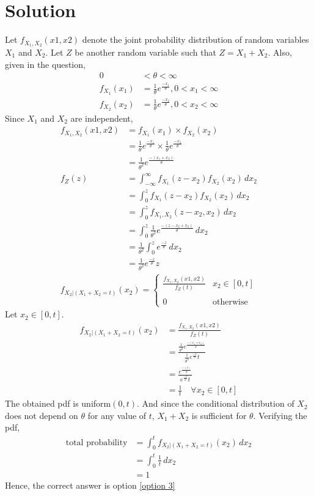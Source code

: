 \documentclass[journal,12pt,twocolumn]{IEEEtran}
\begin{document}
\section*{Solution}
Let $f_{X_1,X_2}(x1,x2)$ denote the joint probability distribution of random variables $X_1$ and $X_2$. Let $Z$ be another random variable such that $Z=X_1+X_2$. Also, given in the question,
\begin{align}
    0 &< \theta < \infty
    \\f_{X_1}(x_1) &= \frac{1}{\theta}e^{\frac{-x_1}{\theta}}, 0<x_1<\infty
    \\f_{X_2}(x_2) &= \frac{1}{\theta}e^{\frac{-x_2}{\theta}}, 0<x_2<\infty
\end{align}
Since $X_1$ and $X_2$ are independent, 
\begin{align}
f_{X_1,X_2}(x1,x2) &= f_{X_1}(x_1) \times f_{X_2}(x_2)
    \\&= \frac{1}{\theta}e^{\frac{-x_1}{\theta}} \times \frac{1}{\theta}e^{\frac{-x_2}{\theta}}
    \\&= \frac{1}{\theta^2}e^{\frac{-(x_1+x_2)}{\theta}}
    \\f_Z(z) &=  \int_{-\infty}^{\infty} f_{X_1}(z-x_2)f_{X_2}(x_2) \,dx_2 
    \\&= \int_{0}^{z} f_{X_1}(z-x_2)f_{X_2}(x_2) \,dx_2
    \\&= \int_{0}^{z} f_{X_1,X_2}(z-x_2, x_2) \,dx_2
    \\&= \int_{0}^{z} \frac{1}{\theta^2}e^{\frac{-(z-x_2+x_2)}{\theta}} \,dx_2
    \\&= \frac{1}{\theta^2}\int_{0}^{z} e^{\frac{-z}{\theta}} \,dx_2
    \\&= \frac{1}{\theta^2}e^{\frac{-z}{\theta}}z
\end{align}
\begin{align}
    f_{X_2|(X_1+X_2=t)}(x_2) = 
    \begin{cases}
    \frac{f_{X_1,X_2}(x1,x2)}{f_Z(t)} &  x_2 \in [0, t]\\ ~\\[-1em]
    0 & \text{otherwise}
    \end{cases}
\end{align}
Let $ x_2 \in [0, t]$.
\begin{align}
    f_{X_2|(X_1+X_2=t)}(x_2) &= \frac{f_{X_1,X_2}(x1,x2)}{f_Z(t)}
    \\&= \frac{\frac{1}{\theta^2}e^{\frac{-(x_1+x_2)}{\theta}}}{\frac{1}{\theta^2}e^{\frac{-t}{\theta}}t}
    \\&= \frac{e^{\frac{-(t)}{\theta}}}{e^{\frac{-t}{\theta}}t}
    \\&= \frac{1}{t} \quad \forall x_2 \in [0, t]
\end{align}
The obtained pdf is uniform$(0,t)$. And since the conditional distribution of $X_2$ does not depend on $\theta$ for any value of $t$, $X_1+X_2$ is sufficient for $\theta$. Verifying the pdf,
\begin{align}
    \text{total probability} &= \int_{0}^{t} f_{X_2|(X_1+X_2=t)}(x_2) \,dx_2
    \\&= \int_{0}^{t} \frac{1}{t} \,dx_2
    \\&= 1
\end{align}
Hence, the correct answer is option \eqref{option 3}
\end{document}
